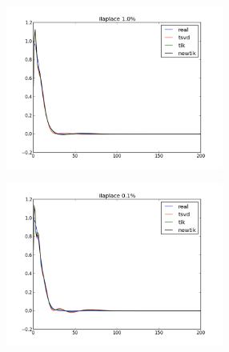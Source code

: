 \documentclass{beamer}
\theoremstyle{plain}
\theoremstyle{definition}
\theoremstyle{remark}
\begin{document}
\begin{frame}
  \begin{figure}
    \centering
    \includegraphics[keepaspectratio,width=270px]{ilaplace_10.png}
  \end{figure}
\end{frame}

\begin{frame}
  \begin{figure}
    \centering
    \includegraphics[keepaspectratio,width=270px]{ilaplace_1.png}
  \end{figure}
\end{frame}
\end{document}
